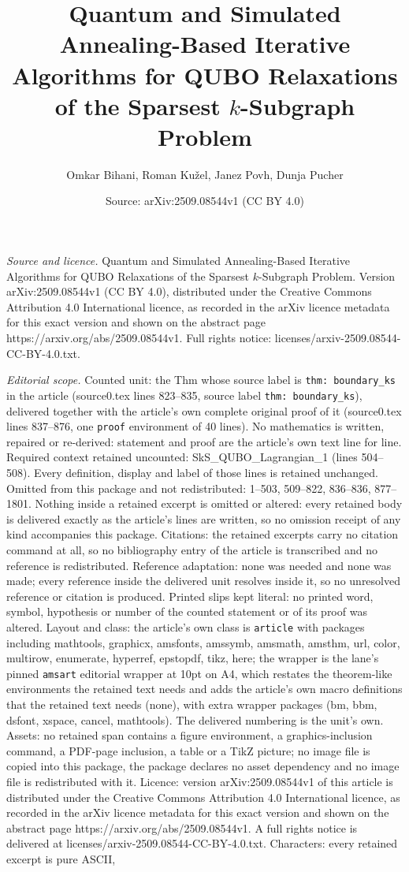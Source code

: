 \documentclass[10pt,a4paper]{amsart}
\title[Quantum and Simulated Annealing-Based Iterative Algorithms f]{Quantum and Simulated Annealing-Based Iterative Algorithms for QUBO Relaxations of the Sparsest $k$-Subgraph Problem}
\author{Omkar Bihani, Roman Ku\v{z}el, Janez Povh, Dunja Pucher}
\date{Source: arXiv:2509.08544v1 (CC BY 4.0)}
\begin{document}
\maketitle

\noindent\emph{Source and licence.} Quantum and Simulated Annealing-Based Iterative Algorithms for QUBO Relaxations of the Sparsest $k$-Subgraph Problem. Version arXiv:2509.08544v1 (CC BY 4.0), distributed under the Creative Commons Attribution 4.0 International licence, as recorded in the arXiv licence metadata for this exact version and shown on the abstract page https://arxiv.org/abs/2509.08544v1. Full rights notice: licenses/arxiv-2509.08544-CC-BY-4.0.txt.\par\smallskip

\noindent\textit{Editorial scope.} Counted unit: the Thm whose source label is \texttt{thm: boundary\_ks} in the article (source0.tex lines 823--835, source label \texttt{thm: boundary\_ks}), delivered together with the article's own complete original proof of it (source0.tex lines 837--876, one \texttt{proof} environment of 40 lines). No mathematics is written, repaired or re-derived: statement and proof are the article's own text line for line. Required context retained uncounted: SkS\_QUBO\_Lagrangian\_1 (lines 504--508). Every definition, display and label of those lines is retained unchanged. Omitted from this package and not redistributed: 1--503, 509--822, 836--836, 877--1801. Nothing inside a retained excerpt is omitted or altered: every retained body is delivered exactly as the article's lines are written, so no omission receipt of any kind accompanies this package. Citations: the retained excerpts carry no citation command at all, so no bibliography entry of the article is transcribed and no reference is redistributed. Reference adaptation: none was needed and none was made; every reference inside the delivered unit resolves inside it, so no unresolved reference or citation is produced. Printed slips kept literal: no printed word, symbol, hypothesis or number of the counted statement or of its proof was altered. Layout and class: the article's own class is \texttt{article} with packages including mathtools, graphicx, amsfonts, amssymb, amsmath, amsthm, url, color, multirow, enumerate, hyperref, epstopdf, tikz, here; the wrapper is the lane's pinned \texttt{amsart} editorial wrapper at 10pt on A4, which restates the theorem-like environments the retained text needs and adds the article's own macro definitions that the retained text needs (none), with extra wrapper packages (bm, bbm, dsfont, xspace, cancel, mathtools). The delivered numbering is the unit's own. Assets: no retained span contains a figure environment, a graphics-inclusion command, a PDF-page inclusion, a table or a TikZ picture; no image file is copied into this package, the package declares no asset dependency and no image file is redistributed with it. Licence: version arXiv:2509.08544v1 of this article is distributed under the Creative Commons Attribution 4.0 International licence, as recorded in the arXiv licence metadata for this exact version and shown on the abstract page https://arxiv.org/abs/2509.08544v1. A full rights notice is delivered at licenses/arxiv-2509.08544-CC-BY-4.0.txt. Characters: every retained excerpt is pure ASCII, 
\end{document}
